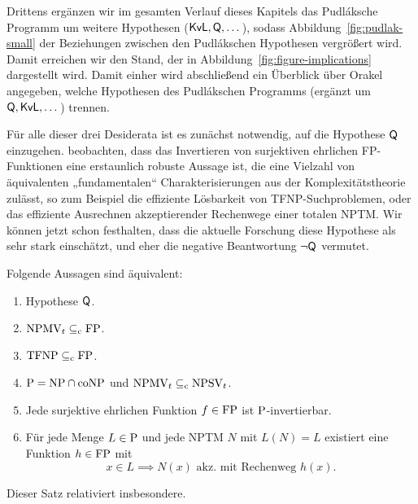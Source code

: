 
Drittens ergänzen wir im gesamten Verlauf dieses Kapitels das Pudláksche Programm um weitere Hypothesen ($\mathsf{KvL}, \hQ, \dots$), sodass Abbildung~\ref{fig:pudlak-small} der Beziehungen zwischen den Pudlákschen Hypothesen vergrößert wird. Damit erreichen wir den Stand, der in Abbildung~\ref{fig:figure-implications} dargestellt wird.
Damit einher wird abschließend ein Überblick über Orakel angegeben, welche Hypothesen des Pudlákschen Programms (ergänzt um $\hQ, \mathsf{KvL}, \dots$) trennen.


Für alle dieser drei Desiderata ist es zunächst notwendig, auf die Hypothese $\hQ$ einzugehen.
\textcite{fenner_inverting_2003} beobachten, dass das Invertieren von surjektiven ehrlichen FP-Funktionen eine erstaunlich robuste Aussage ist, die eine Vielzahl von äquivalenten „fundamentalen“ \parencite{fenner_inverting_2003} Charakterisierungen aus der Komplexitätstheorie zulässt, so zum Beispiel die effiziente Lösbarkeit von TFNP-Suchproblemen, oder das effiziente Ausrechnen akzeptierender Rechenwege einer totalen NPTM. Wir können jetzt schon festhalten, dass die aktuelle Forschung diese Hypothese als sehr stark einschätzt, und eher die negative Beantwortung $\neg\hQ$ vermutet.


\begin{theorem}\label{thm:q-orig}
    Folgende Aussagen sind äquivalent:
    \begin{enumerate}
        \item Hypothese $\hQ$.
        \item $\mathrm{NPMV}_t\subseteqc \mathrm{FP}$.
        \item $\TFNP\subseteqc \mathrm{FP}$.
        \item $\P=\NP\cap\coNP$ und $\mathrm{NPMV}_t\subseteqc \mathrm{NPSV}_t$.
        \item Jede surjektive ehrlichen Funktion $f\in\FP$ ist $\P$-invertierbar.
        \item Für jede Menge $L\in \P$  und jede NPTM $N$ mit $L(N)=L$ existiert eine Funktion $h\in \FP$ mit 
            \[ x\in L \implies N(x) \text{ akz. mit Rechenweg $h(x)$}. \]
    \end{enumerate}
\end{theorem}
Dieser Satz relativiert insbesondere.

